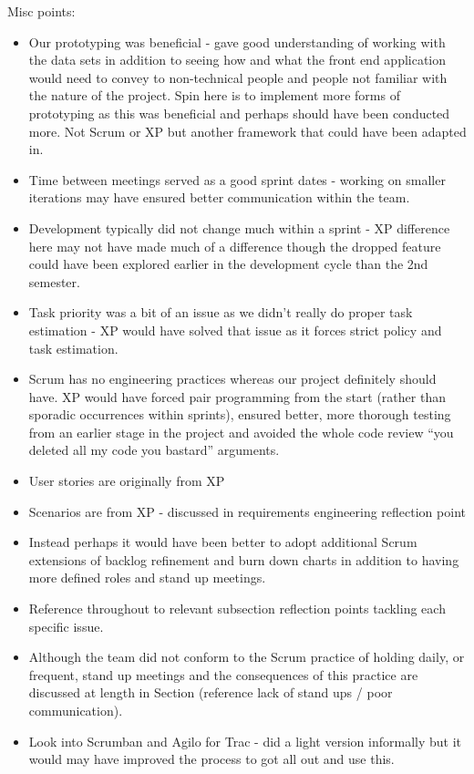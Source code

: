 \documentclass{l3proj}
\begin{document}
Misc points:
\begin{itemize}
\item Our prototyping was beneficial - gave good understanding of working with the data sets in addition to seeing how and what the front end application would need to convey to non-technical people and people not familiar with the nature of the project. Spin here is to implement more forms of prototyping as this was beneficial and perhaps should have been conducted more. Not Scrum or XP but another framework that could have been adapted in. 
\item Time between meetings served as a good sprint dates - working on smaller iterations may have ensured better communication within the team.
\item Development typically did not change much within a sprint - XP difference here may not have made much of a difference though the dropped feature could have been explored earlier in the development cycle than the 2nd semester.
\item Task priority was a bit of an issue as we didn’t really do proper task estimation - XP would have solved that issue as it forces strict policy and task estimation.
\item Scrum has no engineering practices whereas our project definitely should have. XP would have forced pair programming from the start (rather than sporadic occurrences within sprints), ensured better, more thorough testing from an earlier stage in the project and avoided the whole code review “you deleted all my code you bastard” arguments.
\item User stories are originally from XP 
\item Scenarios are from XP - discussed in requirements engineering reflection point 
\item Instead perhaps it would have been better to adopt additional Scrum extensions of backlog refinement and burn down charts in addition to having more defined roles and stand up meetings.
\item Reference throughout to relevant subsection reflection points tackling each specific issue.
\item Although the team did not conform to the Scrum practice of holding daily, or frequent, stand up meetings and the consequences of this practice are discussed at length in Section (reference lack of stand ups / poor communication).
\item Look into Scrumban and Agilo for Trac - did a light version informally but it would may have improved the process to got all out and use this.
\end{itemize}
\end{document}
